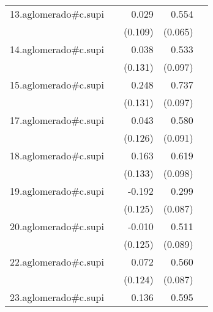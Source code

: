 {\begin{longtable}{l*{4}{D{.}{.}{-1}}}
\addlinespace
13.aglomerado#c.supi&                     &       0.029         &       0.554\sym{***}&                     \\
            &                     &     (0.109)         &     (0.065)         &                     \\
\addlinespace
14.aglomerado#c.supi&                     &       0.038         &       0.533\sym{***}&                     \\
            &                     &     (0.131)         &     (0.097)         &                     \\
\addlinespace
15.aglomerado#c.supi&                     &       0.248         &       0.737\sym{***}&                     \\
            &                     &     (0.131)         &     (0.097)         &                     \\
\addlinespace
17.aglomerado#c.supi&                     &       0.043         &       0.580\sym{***}&                     \\
            &                     &     (0.126)         &     (0.091)         &                     \\
\addlinespace
18.aglomerado#c.supi&                     &       0.163         &       0.619\sym{***}&                     \\
            &                     &     (0.133)         &     (0.098)         &                     \\
\addlinespace
19.aglomerado#c.supi&                     &      -0.192         &       0.299\sym{***}&                     \\
            &                     &     (0.125)         &     (0.087)         &                     \\
\addlinespace
20.aglomerado#c.supi&                     &      -0.010         &       0.511\sym{***}&                     \\
            &                     &     (0.125)         &     (0.089)         &                     \\
\addlinespace
22.aglomerado#c.supi&                     &       0.072         &       0.560\sym{***}&                     \\
            &                     &     (0.124)         &     (0.087)         &                     \\
\addlinespace
23.aglomerado#c.supi&                     &       0.136         &       0.595\sym{***}&                     \\

\end{longtable}}
